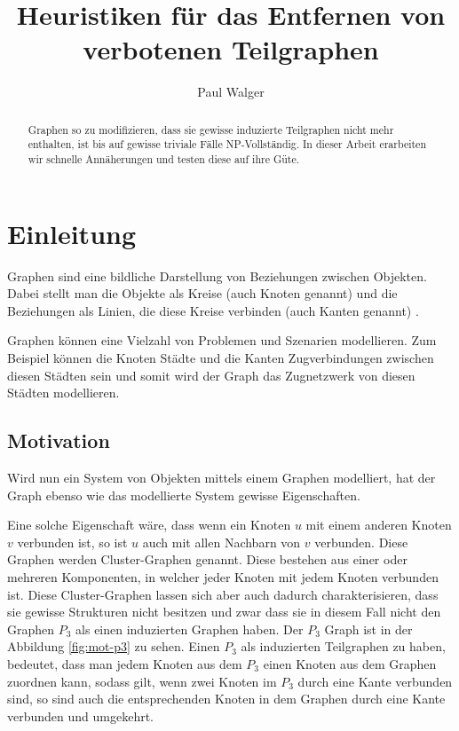 \documentclass[12pt,a4paper,onecolumn,oneside,titlepage]{article}
\author{Paul Walger}
\title{Heuristiken für das Entfernen von verbotenen Teilgraphen}
\begin{document}
\maketitle
\tableofcontents
\newpage
\begin{abstract}
Graphen so zu modifizieren, dass sie gewisse induzierte Teilgraphen nicht mehr enthalten, ist bis auf gewisse triviale Fälle NP-Vollständig.
 In dieser Arbeit erarbeiten wir schnelle Annäherungen und testen diese auf ihre Güte.
  
\end{abstract}
  
\section{Einleitung}

Graphen sind eine bildliche Darstellung von Beziehungen zwischen Objekten. Dabei stellt man die Objekte als Kreise (auch Knoten genannt) und die Beziehungen als Linien, die diese Kreise verbinden (auch Kanten genannt) \cite{Nastos06}.

Graphen können eine Vielzahl von Problemen und Szenarien modellieren. Zum Beispiel können die Knoten Städte und die Kanten Zugverbindungen zwischen diesen Städten sein und somit wird der Graph das Zugnetzwerk von diesen Städten modellieren. 

\subsection{Motivation}
\label{sec:mot}
Wird nun ein System von Objekten mittels einem Graphen modelliert, hat der Graph ebenso wie das modellierte System gewisse Eigenschaften.

Eine solche Eigenschaft wäre, dass wenn ein Knoten $u$ mit einem anderen Knoten $v$ verbunden ist, so ist $u$ auch mit allen Nachbarn von $v$ verbunden. Diese Graphen werden Cluster-Graphen  genannt. Diese bestehen aus einer oder mehreren Komponenten, in welcher jeder Knoten mit jedem Knoten verbunden ist.
Diese Cluster-Graphen lassen sich aber auch dadurch charakterisieren, dass sie gewisse Strukturen nicht besitzen und zwar dass sie in diesem Fall nicht den Graphen $P_3$ als einen induzierten Graphen haben. Der $P_3$ Graph ist in der Abbildung \ref{fig:mot-p3} zu sehen.
Einen $P_3$ als induzierten Teilgraphen zu haben, bedeutet, dass man jedem Knoten aus dem $P_3$ einen Knoten aus dem Graphen zuordnen kann, sodass gilt, wenn zwei Knoten im $P_3$ durch eine Kante verbunden sind, so sind auch die entsprechenden Knoten in dem Graphen durch eine Kante verbunden und umgekehrt.
 
\end{document}
